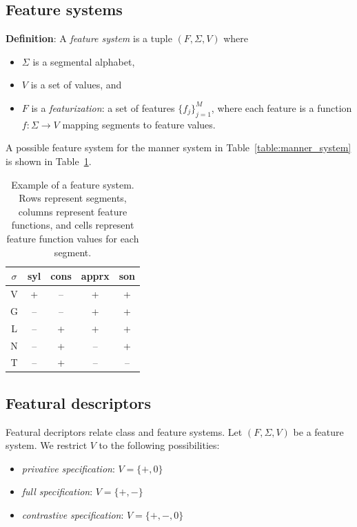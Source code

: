 \documentclass[12pt, oneside]{article}   	%
\begin{document}
\subsection{Feature systems}

\textbf{Definition}: A \textit{feature system} is a tuple $(F, \Sigma, V)$ where
\begin{itemize}
    \item $\Sigma$ is a segmental alphabet, 
    \item $V$ is a set of values, and 
    \item $F$ is a \textit{featurization}: a set of features $\{f_j\}_{j=1}^M$, where each feature is a function $f: \Sigma \rightarrow V$ mapping segments to feature values.
\end{itemize}
A possible feature system for the manner system in Table~\ref{table:manner_system} is shown in Table~\ref{table:featurization}.

\begin{table}[h]
    \centering
    \begin{tabular} {|c||c|c|c|c|}
    \hline
        $\sigma$ & syl & cons & apprx & son \\ \hline
        V & + & -- & + & + \\
        G & -- & -- & + & + \\
        L & -- & + & + & + \\
        N & -- & + & -- & + \\
        T & -- & + & -- & -- \\
        \hline
    \end{tabular}
    \caption{Example of a feature system. Rows represent segments, columns represent feature functions, and cells represent feature function values for each segment.}
    \label{table:featurization}
\end{table}

\subsection{Featural descriptors}

Featural decriptors relate class and feature systems. Let $(F, \Sigma, V)$ be a feature system. We restrict $V$ to the following possibilities:
\begin{itemize}
    \item \textit{privative specification}: $V = \{ +, 0 \}$
    \item \textit{full specification}: $V = \{ +, - \}$
    \item \textit{contrastive specification}: $V = \{ +, -, 0 \}$
\end{itemize}
\end{document}
